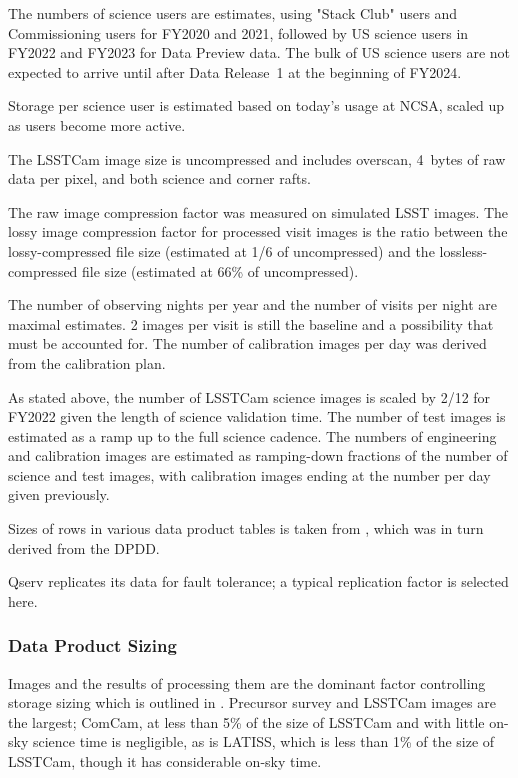 The numbers of science users are estimates, using "Stack Club" users and Commissioning users for FY2020 and 2021, followed by US science users in FY2022 and FY2023 for Data Preview data.
The bulk of US science users are not expected to arrive until after Data Release~1 at the beginning of FY2024.

Storage per science user is estimated based on today's usage at NCSA, scaled up as users become more active.

The LSSTCam image size is uncompressed and includes overscan, 4~bytes of raw data per pixel, and both science and corner rafts.

The raw image compression factor was measured on simulated LSST images.
The lossy image compression factor for processed visit images is the ratio between the lossy-compressed file size (estimated at 1/6 of uncompressed) and the lossless-compressed file size (estimated at 66\% of uncompressed).

The number of observing nights per year and the number of visits per night are maximal estimates.
2 images per visit is still the baseline and a possibility that must be accounted for.
The number of calibration images per day was derived from the calibration plan.

As stated above, the number of LSSTCam science images is scaled by 2/12 for FY2022 given the length of science validation time.
The number of test images is estimated as a ramp up to the full science cadence.
The numbers of engineering and calibration images are estimated as ramping-down fractions of the number of science and test images, with calibration images ending at the number per day given previously.

Sizes of rows in various data product tables is taken from , which was in turn derived from the DPDD.

Qserv replicates its data for fault tolerance; a typical replication factor is selected here.

\subsubsection{Data Product Sizing}
Images and the results of processing them are the dominant factor controlling storage sizing which is outlined in .
Precursor survey and LSSTCam images are the largest; ComCam, at less than 5\% of the size of LSSTCam and with little on-sky science time is negligible, as is LATISS, which is less than 1\% of the size of LSSTCam, though it has considerable on-sky time.

